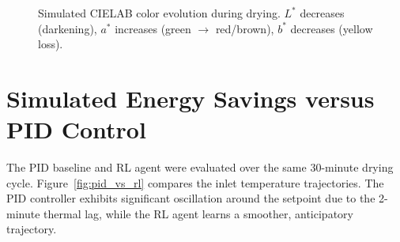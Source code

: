 ﻿\documentclass[12pt, a4paper]{report}
\begin{document}
\begin{figure}[H]
\centering
{}
\caption{Simulated CIELAB color evolution during drying. $L^*$ decreases (darkening), $a^*$ increases (green $\to$ red/brown), $b^*$ decreases (yellow loss).}
\label{fig:color_evolution}
\end{figure}


\section{Simulated Energy Savings versus PID Control}
The PID baseline and RL agent were evaluated over the same 30-minute drying cycle. Figure~\ref{fig:pid_vs_rl} compares the inlet temperature trajectories. The PID controller exhibits significant oscillation around the setpoint due to the 2-minute thermal lag, while the RL agent learns a smoother, anticipatory trajectory.
\end{document}
